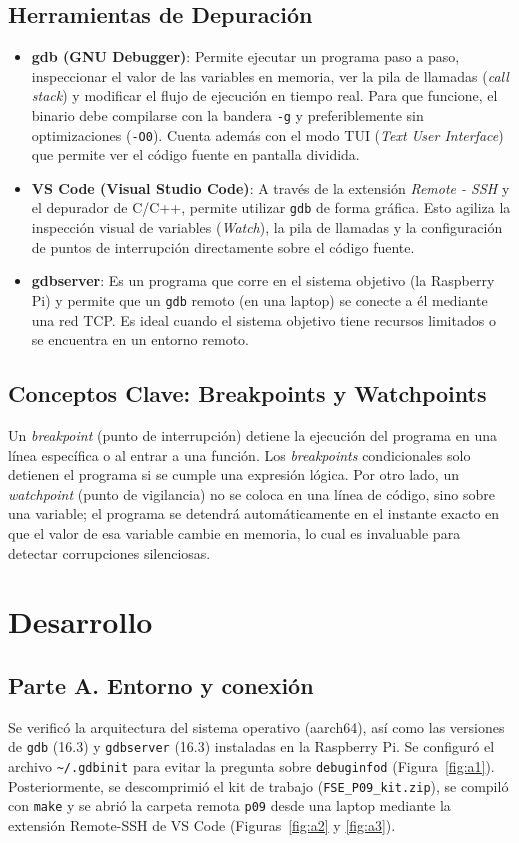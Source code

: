\documentclass[conference]{IEEEtran}
\begin{document}
\subsection{Herramientas de Depuración}
\begin{itemize}
	\item \textbf{gdb (GNU Debugger)}: Permite ejecutar un programa paso a paso, inspeccionar el valor de las variables en memoria, ver la pila de llamadas (\textit{call stack}) y modificar el flujo de ejecución en tiempo real. Para que funcione, el binario debe compilarse con la bandera \texttt{-g} y preferiblemente sin optimizaciones (\texttt{-O0}). Cuenta además con el modo TUI (\textit{Text User Interface}) que permite ver el código fuente en pantalla dividida.
	\item \textbf{VS Code (Visual Studio Code)}: A través de la extensión \textit{Remote - SSH} y el depurador de C/C++, permite utilizar \texttt{gdb} de forma gráfica. Esto agiliza la inspección visual de variables (\textit{Watch}), la pila de llamadas y la configuración de puntos de interrupción directamente sobre el código fuente.
	\item \textbf{gdbserver}: Es un programa que corre en el sistema objetivo (la Raspberry Pi) y permite que un \texttt{gdb} remoto (en una laptop) se conecte a él mediante una red TCP. Es ideal cuando el sistema objetivo tiene recursos limitados o se encuentra en un entorno remoto.
\end{itemize}

\subsection{Conceptos Clave: Breakpoints y Watchpoints}
Un \textit{breakpoint} (punto de interrupción) detiene la ejecución del programa en una línea específica o al entrar a una función. Los \textit{breakpoints} condicionales solo detienen el programa si se cumple una expresión lógica. Por otro lado, un \textit{watchpoint} (punto de vigilancia) no se coloca en una línea de código, sino sobre una variable; el programa se detendrá automáticamente en el instante exacto en que el valor de esa variable cambie en memoria, lo cual es invaluable para detectar corrupciones silenciosas.

\section{Desarrollo}

\subsection{Parte A. Entorno y conexión}
Se verificó la arquitectura del sistema operativo (aarch64), así como las versiones de \texttt{gdb} (16.3) y \texttt{gdbserver} (16.3) instaladas en la Raspberry Pi. Se configuró el archivo \texttt{\textasciitilde/.gdbinit} para evitar la pregunta sobre \texttt{debuginfod} (Figura~\ref{fig:a1}). Posteriormente, se descomprimió el kit de trabajo (\texttt{FSE\_P09\_kit.zip}), se compiló con \texttt{make} y se abrió la carpeta remota \texttt{p09} desde una laptop mediante la extensión Remote-SSH de VS Code (Figuras~\ref{fig:a2} y \ref{fig:a3}).
\end{document}
